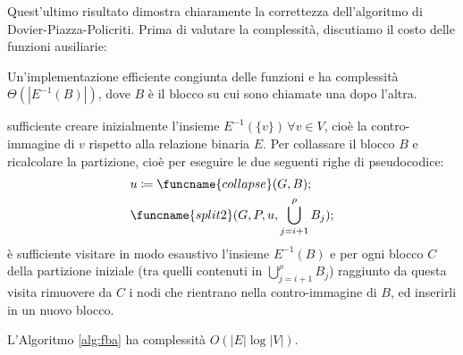 Quest'ultimo risultato dimostra chiaramente la correttezza dell'algoritmo di Dovier-Piazza-Policriti. Prima di valutare la complessità, discutiamo il costo delle funzioni ausiliarie:
\begin{observation}
    Un'implementazione efficiente congiunta delle funzioni  e  ha complessità $\Theta(|E^{-1}(B)|)$, dove $B$ è il blocco su cui sono chiamate una dopo l'altra.
\end{observation}
\begin{proof2}
    \accente sufficiente creare inizialmente l'insieme $E^{-1}(\{v\}) \, \forall v \in V$, cioè la contro-immagine di $v$ rispetto alla relazione binaria $E$. Per collassare il blocco $B$ e ricalcolare la partizione, cioè per eseguire le due seguenti righe di pseudocodice:
    \begin{align*}
        &u \coloneqq \funcname{collapse}(G,B);\\
        &\funcname{split2}(G, P, u, \bigcup_{j=i+1}^\rho B_j);
    \end{align*}
    è sufficiente visitare in modo esaustivo l'insieme $E^{-1}(B)$ e per ogni blocco $C$ della partizione iniziale (tra quelli contenuti in $\bigcup_{j=i+1}^\rho B_j$) raggiunto da questa visita rimuovere da $C$ i nodi che rientrano nella contro-immagine di $B$, ed inserirli in un nuovo blocco.
\end{proof2}
\begin{theorem}
    L'Algoritmo \ref{alg:fba} ha complessità $O(|E| \log |V|)$.
\end{theorem}
